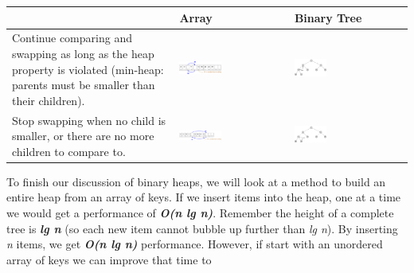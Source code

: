 \begin{center}
	\begin{table}
		\begin{tabular}{|p{}|M{0.4\textwidth}|M{0.30\textwidth}|}
			\hline
			  & Array & Binary Tree \\
			\hline
			\scriptsize{Continue comparing and swapping as long as the heap property is violated (min-heap: parents must be smaller than their children).}
			& 
			\includegraphics[width=0.40\textwidth]{images/3013_heap_percdown_3_array.png}&
			\includegraphics[width=0.30\textwidth]{images/3013_heap_percdown_3.png}\\
			\hline
			\scriptsize{Stop swapping when no child is smaller, or there are no more children to compare to.}
			& 
			\includegraphics[width=0.40\textwidth]{images/3013_heap_percdown_4_array.png}&
			\includegraphics[width=0.30\textwidth]{images/3013_heap_percdown_4.png}\\
			\hline
		\end{tabular}
		\label{tab:removemin1}
	\end{table}
\end{center}



To finish our discussion of binary heaps, we will look at a method to build an entire heap from an array of keys. If we insert items into the heap, one at a time we would get a performance of \textbf{\textit{O(n lg n)}}. Remember the height of a complete tree is \textbf{\textit{lg n}} (so each new item cannot bubble up further than \textit{lg n}). By inserting \textit{n} items, we get \textbf{\textit{O(n lg n)}} performance. However, if start with an unordered array of keys we can improve that time to 

